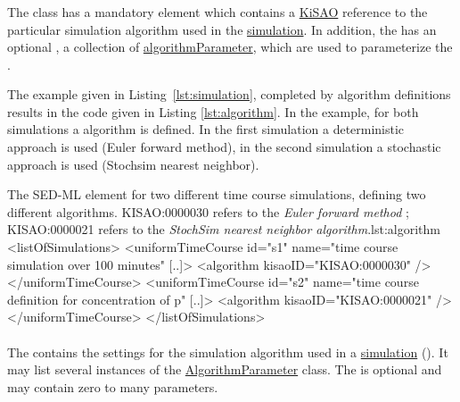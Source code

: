 \subsubsection{}
\label{class:algorithm}
The  class has a mandatory element \hyperref[sec:kisaoid]{} which contains a \hyperref[sec:kisao]{KiSAO} reference to the particular simulation algorithm used in the \hyperref[class:simulation]{simulation}. In addition, the  has an optional \hyperref[class:listOfAlgorithmParameters]{}, a collection of \hyperref[class:algorithmParameter]{algorithmParameter}, which are used to parameterize the .

The example given in Listing~\ref{lst:simulation}, completed by algorithm definitions results in the code given in Listing \ref{lst:algorithm}. In the example, for both simulations a algorithm is defined. In the first simulation  a deterministic approach is used (Euler forward method), in the second simulation  a stochastic approach is used (Stochsim nearest neighbor).

\begin{myXmlLst}{The SED-ML  element for two different time course simulations, defining two different algorithms. KISAO:0000030 refers to the \emph{Euler forward method} ; KISAO:0000021 refers to the \emph{StochSim nearest neighbor algorithm}.}{lst:algorithm}
<listOfSimulations>
	<uniformTimeCourse id="s1" name="time course simulation over 100 minutes" [..]>
		<algorithm kisaoID="KISAO:0000030" />
	</uniformTimeCourse>
	<uniformTimeCourse id="s2" name="time course definition for concentration of p" [..]>
		<algorithm kisaoID="KISAO:0000021" />
	</uniformTimeCourse>
</listOfSimulations>
\end{myXmlLst}


\paragraph*{}
\label{class:listOfAlgorithmParameters}
The  contains the settings for the simulation algorithm used in a \hyperref[class:simulation]{simulation} (). It may list several instances of the \hyperref[class:algorithmParameter]{AlgorithmParameter} class. The  is optional and may contain zero to many parameters.

